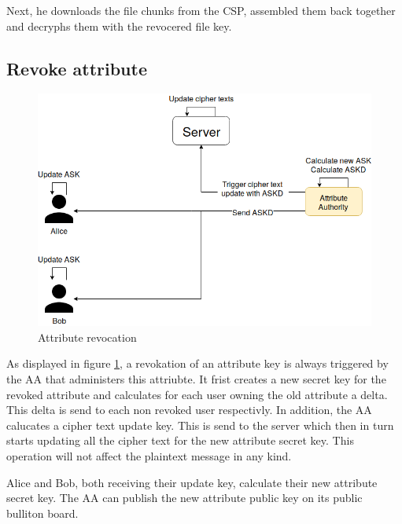 Next, he downloads the file chunks from the CSP, assembled them back together and decryphs them with the revocered file key.

\subsection{Revoke attribute}
\begin{figure}[!t]
\centering
    \includegraphics[width=\linewidth]{img/TF-DAC-MACS-overview-revoce-attr.png}
    \caption{Attribute revocation}
    \label{fig:tfdacmacs-attr-revocation}
\end{figure}

As displayed in figure \ref{fig:tfdacmacs-attr-revocation}, a revokation of an attribute key is always triggered by the AA that administers this attriubte. It frist creates a new secret key for the revoked attribute and calculates for each user owning the old attribute a delta. This delta is send to each non revoked user respectivly. In addition, the AA calucates a cipher text update key. This is send to the server which then in turn starts updating all the cipher text for the new attribute secret key. This operation will not affect the plaintext message in any kind. 

Alice and Bob, both receiving their update key, calculate their new attribute secret key. The AA can publish the new attribute public key on its public bulliton board.


